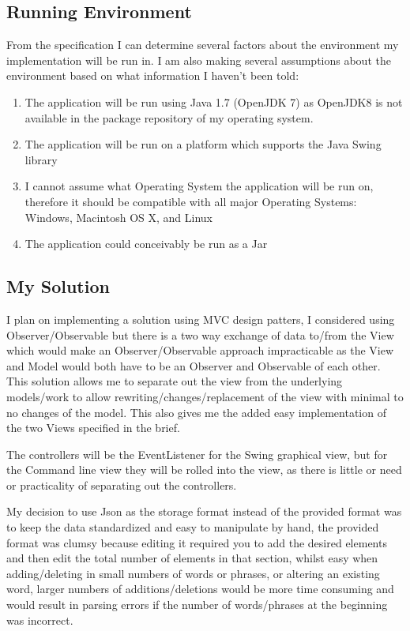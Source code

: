 \documentclass[a4paper, 11pt]{article}
\begin{document}
\subsection{Running Environment}

From the specification I can determine several factors about the environment my implementation will be run in. I am also making several assumptions about the environment based on what information I haven't been told:

\begin{enumerate}
\item The application will be run using Java 1.7 (OpenJDK 7) as OpenJDK8 is not available in the package repository of my operating system. 
\item The application will be run on a platform which supports the Java Swing library
\item I cannot assume what Operating System the application will be run on, therefore it should be compatible with all major Operating Systems: Windows, Macintosh OS X, and Linux
\item The application could conceivably be run as a Jar
\end{enumerate}

\subsection{My Solution}

I plan on implementing a solution using MVC design patters, I considered using Observer/Observable but there is a two way exchange of data to/from the View which would make an Observer/Observable approach impracticable as the View and Model would both have to be an Observer and Observable of each other. This solution allows me to separate out the view from the underlying models/work to allow rewriting/changes/replacement of the view with minimal to no changes of the model. This also gives me the added easy implementation of the two Views specified in the brief. 

The controllers will be the EventListener for the Swing graphical view, but for the Command line view they will be rolled into the view, as there is little or need or practicality of separating out the controllers. 

My decision to use Json as the storage format instead of the provided format was to keep the data standardized and easy to manipulate by hand, the provided format was clumsy because editing it required you to add the desired elements and then edit the total number of elements in that section, whilst easy when adding/deleting in small numbers of words or phrases, or altering an existing word, larger numbers of additions/deletions would be more time consuming and would result in parsing errors if the number of words/phrases at the beginning was incorrect. 
\end{document}
